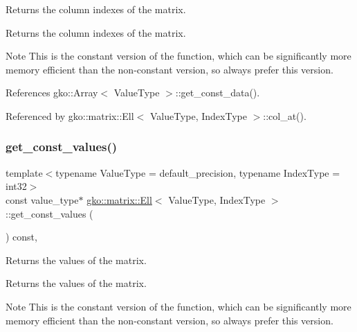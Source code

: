 Returns the column indexes of the matrix. 

\begin{DoxyReturn}{Returns}
the column indexes of the matrix.
\end{DoxyReturn}
\begin{DoxyNote}{Note}
This is the constant version of the function, which can be significantly more memory efficient than the non-\/constant version, so always prefer this version. 
\end{DoxyNote}


References gko\+::\+Array$<$ Value\+Type $>$\+::get\+\_\+const\+\_\+data().



Referenced by gko\+::matrix\+::\+Ell$<$ Value\+Type, Index\+Type $>$\+::col\+\_\+at().

\mbox{\label{classgko_1_1matrix_1_1Ell_a5bc4d3c67b328b353409e76eb9f70803}} 
\subsubsection{\texorpdfstring{get\+\_\+const\+\_\+values()}{get\_const\_values()}}
{\footnotesize\ttfamily template$<$typename Value\+Type = default\+\_\+precision, typename Index\+Type = int32$>$ \\
const value\+\_\+type$\ast$ \hyperlink{classgko_1_1matrix_1_1Ell}{gko\+::matrix\+::\+Ell}$<$ Value\+Type, Index\+Type $>$\+::get\+\_\+const\+\_\+values (\begin{DoxyParamCaption}{ }\end{DoxyParamCaption}) const\hspace{0.3cm}{\ttfamily [inline]}, {\ttfamily [noexcept]}}



Returns the values of the matrix. 

\begin{DoxyReturn}{Returns}
the values of the matrix.
\end{DoxyReturn}
\begin{DoxyNote}{Note}
This is the constant version of the function, which can be significantly more memory efficient than the non-\/constant version, so always prefer this version. 
\end{DoxyNote}


